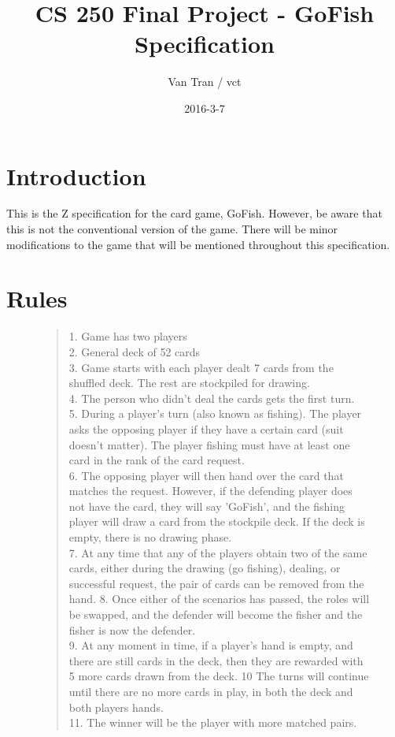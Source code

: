 \documentclass{article}
\title{CS 250 Final Project - GoFish Specification}
\author{Van Tran / vct}
\date{2016-3-7}
\begin{document}
\maketitle

\section*{Introduction}
This is the Z specification for the card game, GoFish.
However, be aware that this is not the conventional version
of the game. There will be minor modifications to the game
that will be mentioned throughout this specification.

\section*{Rules}
\begin{figure}[h]
\begin{quotation}
1. Game has two players \\
2. General deck of 52 cards \\
3. Game starts with each player dealt 7 cards from the
shuffled deck. The rest are stockpiled for drawing. \\
4. The person who didn't deal the cards gets the first turn. \\
5. During a player's turn (also known as fishing). The player
asks the opposing player if they have a certain card (suit doesn't matter).
The player fishing must have at least one card in the rank of the card request. \\
6. The opposing player will then hand over the card that matches
the request. However, if the defending player does not have the card,
they will say 'GoFish', and the fishing player will draw a card
from the stockpile deck. If the deck is empty, there is no drawing phase. \\
7. At any time that any of the players obtain two of the same cards,
either during the drawing (go fishing), dealing, or successful request,
the pair of cards can be removed from the hand.
8. Once either of the scenarios has passed, the roles will be swapped,
and the defender will become the fisher and the fisher is now the defender. \\
9. At any moment in time, if a player's hand is empty, and there are still
cards in the deck, then they are rewarded with 5 more cards drawn from the deck.
10 The turns will continue until there are no more cards in play, in both
the deck and both players hands. \\
11. The winner will be the player with more matched pairs. \\
\end{quotation}
\end{figure}
\end{document}
